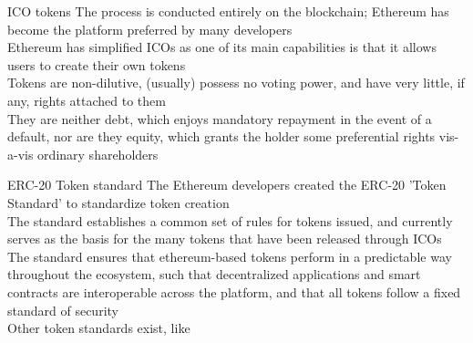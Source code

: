 \documentclass[11pt]{beamer}
\begin{document}

\begin{frame}{ICO tokens}
	The process is conducted entirely on the blockchain; Ethereum has become the platform preferred by many developers\\ \vspace{3mm}
	Ethereum has simplified ICOs as one of its main capabilities is that it allows users to create their own tokens\\ \vspace{3mm}
	Tokens are non-dilutive, (usually) possess no voting power, and have very little, if any, rights attached to them \\ \vspace{3mm}
	They are neither debt, which enjoys mandatory repayment in the event of a default, nor are they equity, which grants the holder some preferential rights vis-a-vis ordinary shareholders
\end{frame}


\begin{frame}{ERC-20 Token standard}
	The Ethereum developers created the ERC-20 'Token Standard' to standardize token creation\\ \vspace{3mm}
	The standard establishes a common set of rules for tokens issued, and currently serves as the basis for the many tokens that have been released through ICOs \\ \vspace{3mm}
	The standard ensures that ethereum-based tokens perform in a predictable way throughout the ecosystem, such that decentralized applications and smart contracts are interoperable across the platform, and that all tokens follow a fixed standard of security\\ \vspace{3mm}
	Other token standards exist, like
\end{frame}

\end{document}
